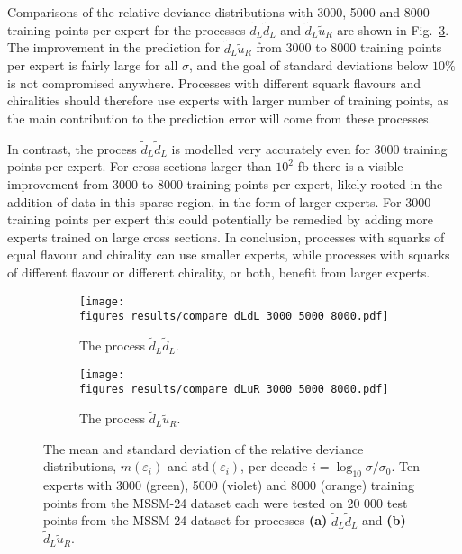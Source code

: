 \documentclass[twoside,english]{uiofysmaster}
\begin{document}
{{Comparisons of the relative deviance distributions with 3000, 5000 and 8000 training points per expert for the processes $\widetilde{d}_L \widetilde{d}_L$ and $\widetilde{d}_L \widetilde{u}_R$ are shown in Fig.~\ref{Fig:: results : RD 3000 vs 5000}. The improvement in the prediction for $\widetilde{d}_L \widetilde{u}_R$ from 3000 to 8000 training points per expert is fairly large for all $\sigma$, and the goal of standard deviations below $10\%$ is not compromised anywhere. Processes with different squark flavours and chiralities should therefore use experts with larger number of training points, as the main contribution to the prediction error will come from these processes. 

In contrast, the process $\widetilde{d}_L \widetilde{d}_L$ is modelled very accurately even for 3000 training points per expert. For cross sections larger than $10^2$ fb there is a visible improvement from 3000 to 8000 training points per expert, likely rooted in the addition of data in this sparse region, in the form of larger experts. For 3000 training points per expert this could potentially be remedied by adding more experts trained on large cross sections. In conclusion, processes with squarks of equal flavour and chirality can use smaller experts, while processes with squarks of different flavour or different chirality, or both, benefit from larger experts.







\begin{figure}
    \centering
    \begin{subfigure}[b]{0.9\textwidth}
        \texttt{[image: figures\_results/compare\_dLdL\_3000\_5000\_8000.pdf]}
        \caption{The process $\widetilde{d}_L \widetilde{d}_L$.}
        \label{Fig:: results : RD MSSM-24 uLuL experts}
    \end{subfigure}
    \begin{subfigure}[b]{0.9\textwidth}
        \texttt{[image: figures\_results/compare\_dLuR\_3000\_5000\_8000.pdf]}
        \caption{The process $\widetilde{d}_L\widetilde{u}_R$.}
        \label{Fig :: results : RD MSSM-24 uLdL experts}
    \end{subfigure}
    \caption{The mean and standard deviation of the relative deviance distributions, $m(\varepsilon_i)$ and $\mathrm{std}(\varepsilon_i)$, per decade $i =\log_{10} \sigma / \sigma_0$. Ten experts with 3000 (green), 5000 (violet) and 8000 (orange) training points from the MSSM-24 dataset each were tested on 20 000 test points from the MSSM-24 dataset for processes \textbf{(a)}  $\widetilde{d}_L \widetilde{d}_L$ and \textbf{(b)} $\widetilde{d}_L\widetilde{u}_R$. }
\label{Fig:: results : RD 3000 vs 5000}
\end{figure}

}}
\end{document}
